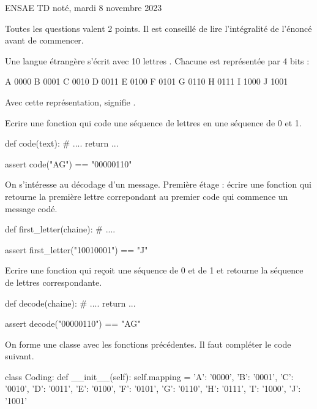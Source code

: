 %

\huge ENSAE TD noté, mardi 8 novembre 2023 \normalsize

Toutes les questions valent 2 points. Il est conseillé de lire l'intégralité de l'énoncé avant de commencer.

\exosubject{}
\begin{xexercice}\label{td_note_label4_2023}

Une langue étrangère s'écrit avec 10 lettres . Chacune est représentée par 4 bits :

\begin{verbatimx}
A 0000
B 0001
C 0010
D 0011
E 0100
F 0101
G 0110
H 0111
I 1000
J 1001
\end{verbatimx}

Avec cette représentation,  signifie .

\exequest Ecrire une fonction qui code une séquence de lettres en une séquence de 0 et 1.

\begin{verbatimx}
def code(text):
    # ....
    return ...

assert code("AG") == "00000110"
\end{verbatimx}

\exequest On s'intéresse au décodage d'un message. Première étage : écrire une fonction qui retourne la première lettre
correpondant au premier code qui commence un message codé.

\begin{verbatimx}
def first_letter(chaine):
   # ....

assert first_letter("10010001") == "J"
\end{verbatimx}


\exequest Ecrire une fonction qui reçoit une séquence de 0 et de 1 et retourne la séquence de lettres correspondante.

\begin{verbatimx}
def decode(chaine):
    # ....
    return ...

assert decode("00000110") == "AG"
\end{verbatimx}

\exequest On forme une classe avec les fonctions précédentes. Il faut compléter le code suivant.

\begin{verbatimx}
class Coding:
    def __init__(self):
        self.mapping = {'A': '0000', 'B': '0001', 'C': '0010', 'D': '0011',
                        'E': '0100', 'F': '0101', 'G': '0110', 'H': '0111',
                        'I': '1000', 'J': '1001' }


\end{verbatimx}
\end{xexercice}
